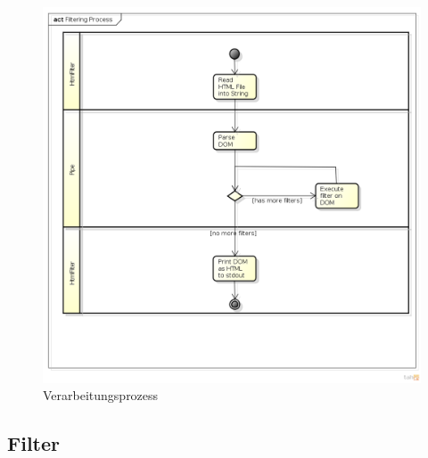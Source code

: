 \begin{figure}[H]
	\begin{center}
		\includegraphics[width=1.0\textwidth]{./content/Filtering_Process_cut.png}
	\end{center}
	\caption{Verarbeitungsprozess}
	\label{fig:process}
\end{figure}


\newpage
\subsection{Filter}

